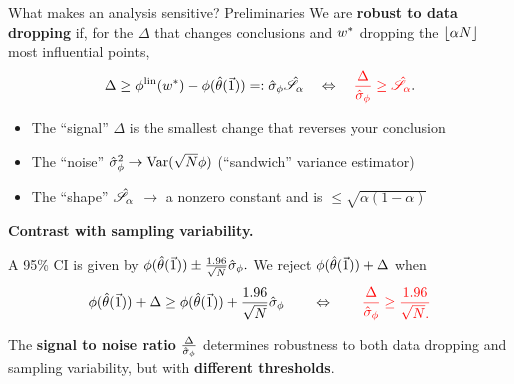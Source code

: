 





\begin{frame}{What makes an analysis sensitive?  Preliminaries}
%
We are \textbf{robust to data dropping} if, for the $\Delta$
that changes conclusions and $w^*$ dropping the $\lfloor \alpha N \rfloor$
most influential points,
%
\begin{align*}
%
\Delta \ge \thetafunlin(\w^*) - \thetafun(\thetahat(\onevec))
    =:   {\color{black} \noise } { \color{black} \shape}
\quad\Leftrightarrow\quad
%
{\color{red}\frac{\Delta}{\noise} \ge \shape}.
%
\end{align*}
%

\begin{itemize}
\item The ``signal'' $\Delta$ is the smallest change that reverses your conclusion
\item The ``noise'' $\hat\sigma_{\phi}^2 \rightarrow \mathrm{Var}(\sqrt{N}\phi)$
    (``sandwich'' variance estimator)
\item The ``shape''
    $\hat{\mathscr{S}}_\alpha$
    $\rightarrow$ a nonzero constant and is
    $\le \sqrt{\alpha (1 - \alpha)}$
\end{itemize}

\hrulefill

\textbf{Contrast with sampling variability.}

A 95\% CI is given by
$\phi(\hat{\theta}(\vec{1})) \pm \frac{1.96}{\sqrt{N}} \hat\sigma_{\phi}.$
%
We reject $\phi(\hat{\theta}(\vec{1})) + \Delta$ when
%
\begin{align*}
%
\thetafun(\thetahat(\onevec)) + \Delta \ge
\thetafun(\thetahat(\onevec)) + \frac{1.96}{\sqrt{N}} \noise
\quad\quad
\Leftrightarrow
\quad\quad
{\color{red}
\frac{\Delta}{\noise} \ge \frac{1.96}{\sqrt{N}.}
}
%
\end{align*}
%


\hrulefill

The \textbf{signal to noise ratio} $\frac{\Delta}{\hat\sigma_{\phi}}$
determines robustness to both data dropping
and sampling variability, but with \textbf{different thresholds}.


\end{frame}
